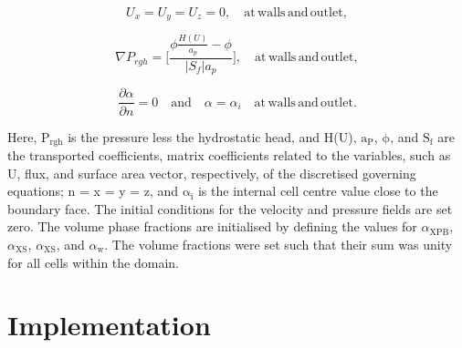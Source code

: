 \begin{equation}
    \label{eq:boundaryU}
    U_x = U_y = U_z = 0, \quad \mathrm{at \, walls\, and\, outlet},
\end{equation}

\begin{equation}
    \label{eq:boundaryPrgh}
    \nabla P_{rgh} = \bigg[\frac{\phi \frac{H(U)}{a_p} - \phi}{|S_f|a_p} \bigg], \quad \mathrm{at \, walls\, and\, outlet},
\end{equation}

\begin{equation}
    \label{eq:boundaryAlpha}
    \frac{\partial \alpha}{\partial n} = 0 \quad \mathrm{and} \quad \alpha = \alpha_i \quad \mathrm{at \, walls\, and\, outlet}.
\end{equation}

Here, $\mathrm{P_{rgh}}$ is the pressure less the hydrostatic head, and H(U), $\mathrm{a_P}$, $\mathrm{\phi}$, and $\mathrm{S_f}$ are the transported coefficients, matrix coefficients related to the variables, such as U, flux, and surface area vector, respectively, of the discretised governing equations; n = x = y = z, and $\mathrm{\alpha_i}$ is the internal cell centre value close to the boundary face. The initial conditions for the velocity and pressure fields are set zero. The volume phase fractions are initialised by defining the values for $\alpha_{\mathrm{XPB}}$, $\alpha_{\mathrm{XS}}$, $\alpha_{\mathrm{XS}}$, and $\alpha_{\mathrm{w}}$. The volume fractions were set such that their sum was unity for all cells within the domain. 


\section{Implementation}

